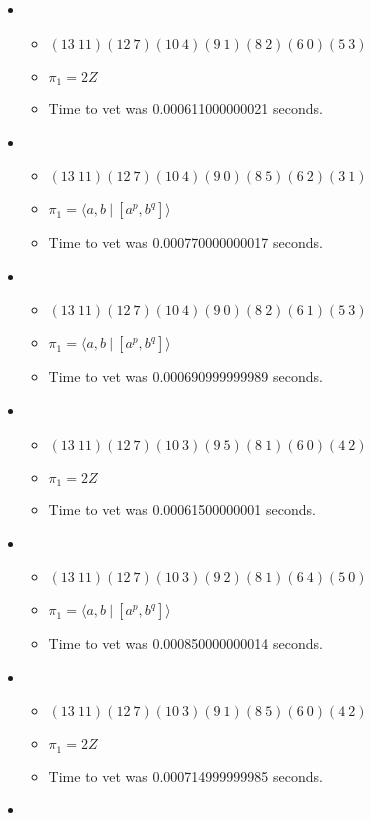 \documentclass{article}
\begin{document}
\begin{itemize}
\item \begin{itemize}
      \item $(13\ 11)(12\ 7)(10\ 4)(9\ 1)(8\ 2)(6\ 0)(5\ 3)$
      \item $\pi_1 =2 Z$
      \item Time to vet was 0.000611000000021 seconds.
\end{itemize}
\item \begin{itemize}
      \item $(13\ 11)(12\ 7)(10\ 4)(9\ 0)(8\ 5)(6\ 2)(3\ 1)$
      \item $\pi_1 = \langle a,b\ |\ [a^p,b^q]\rangle$
      \item Time to vet was 0.000770000000017 seconds.
\end{itemize}
\item \begin{itemize}
      \item $(13\ 11)(12\ 7)(10\ 4)(9\ 0)(8\ 2)(6\ 1)(5\ 3)$
      \item $\pi_1 = \langle a,b\ |\ [a^p,b^q]\rangle$
      \item Time to vet was 0.000690999999989 seconds.
\end{itemize}
\item \begin{itemize}
      \item $(13\ 11)(12\ 7)(10\ 3)(9\ 5)(8\ 1)(6\ 0)(4\ 2)$
      \item $\pi_1 =2 Z$
      \item Time to vet was 0.00061500000001 seconds.
\end{itemize}
\item \begin{itemize}
      \item $(13\ 11)(12\ 7)(10\ 3)(9\ 2)(8\ 1)(6\ 4)(5\ 0)$
      \item $\pi_1 = \langle a,b\ |\ [a^p,b^q]\rangle$
      \item Time to vet was 0.000850000000014 seconds.
\end{itemize}
\item \begin{itemize}
      \item $(13\ 11)(12\ 7)(10\ 3)(9\ 1)(8\ 5)(6\ 0)(4\ 2)$
      \item $\pi_1 =2 Z$
      \item Time to vet was 0.000714999999985 seconds.
\end{itemize}
\item \begin{itemize}

\end{itemize}
\end{itemize}
\end{document}
